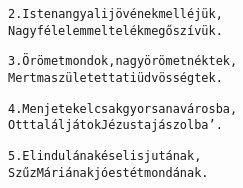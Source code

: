 \begin{minipage}{\textwidth}
\kottastart
{}
\kottaend
\begin{minipage}{\textwidth}
\begin{multicols}{2}
\begin{minipage}{\textwidth}
\begin{alltt}
2. Isten angyali jövének melléjük,
   Nagy félelemmel telék meg ő szívük.
\end{alltt}
\vspace{0.0cm}
\versszakspacing
\end{minipage}
\begin{minipage}{\textwidth}
\begin{alltt}
3. Örömet mondok, nagy örömet néktek,
   Mert ma született a ti üdvösségtek.
\end{alltt}
\vspace{0.0cm}
\versszakspacing
\end{minipage}
\begin{minipage}{\textwidth}
\begin{alltt}
4. Menjetek el csak gyorsan a városba,
   Ott találjátok Jézust a jászolba'.
\end{alltt}
\vspace{0.0cm}
\versszakspacing
\end{minipage}
\begin{minipage}{\textwidth}
\begin{alltt}
5. Elindulának és el is jutának,
   Szűz Máriának jóestét mondának.
\end{alltt}
\vspace{0.0cm}
\versszakspacing
\end{minipage}
\vspace{0.2cm}
\end{multicols}
\end{minipage}

\end{minipage}
~\vspace{1.0cm}
\newline
